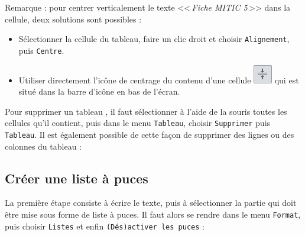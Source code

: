 
\vspace{24pt}



Remarque : pour centrer verticalement le texte <<\,\emph{Fiche MITIC 5}\,>> dans la cellule, deux solutions sont possibles :

\begin{itemize}
\item Sélectionner la cellule du tableau, faire un clic droit et choisir \texttt{Alignement}, puis \texttt{Centre}.  


\item Utiliser directement l'icône de centrage du contenu d'une cellule \includegraphics[width=.6cm]{./images/texte02/iconeTableauCentrage} qui est situé dans la barre d'icône en bas de l'écran.
\end{itemize}  

\vspace{24pt} 

Pour supprimer un tableau , il faut sélectionner à l'aide de la souris toutes les cellules qu'il contient, puis dans le menu \texttt{Tableau}, choisir \texttt{Supprimer} puis \texttt{Tableau}. Il est également possible de cette façon de supprimer des lignes ou des colonnes du tableau :








\subsection{Créer une liste à puces}\label{Texte2ListePuce} 

La première étape consiste à écrire le texte, puis à sélectionner la partie qui doit être mise sous forme de liste à puces. Il faut alors se rendre dans le menu \texttt{Format}, puis choisir \texttt{Listes} et enfin \texttt{(Dés)activer les puces} :      

